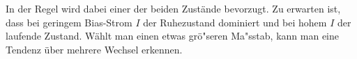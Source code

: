 \documentclass[12pt,a4paper]{article}
\begin{document}
In der Regel wird dabei einer der beiden Zustände bevorzugt. Zu erwarten ist, dass bei geringem Bias-Strom $I$ der Ruhezustand dominiert und bei hohem $I$ der laufende Zustand. Wählt man einen etwas grö"seren Ma"sstab, kann man eine Tendenz über mehrere Wechsel erkennen.
\begin{figure}[H]
	\\	 

\end{figure}
\end{document}
